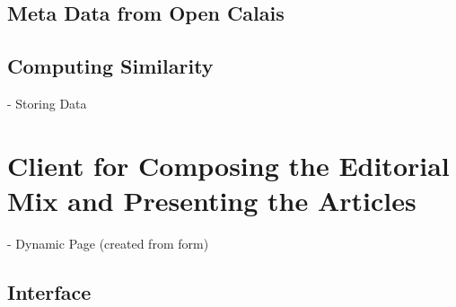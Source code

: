 \subsection{Meta Data from Open Calais}

\subsection{Computing Similarity}
    - Storing Data

\section{Client for Composing the Editorial Mix and Presenting the Articles}
- Dynamic Page (created from form)


\subsection{Interface}

